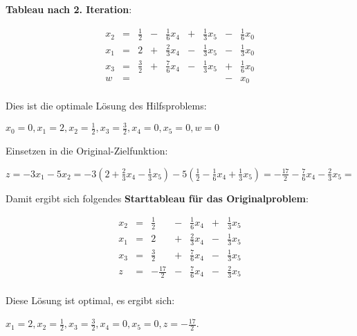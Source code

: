 \documentclass[a4paper,11pt]{article}
\begin{document}
\begin{enumerate}
        \textbf{Tableau nach 2. Iteration}:

        \[\begin{array}{rcrcrcrcr}
            x_2 & = & \frac{1}{2} & - & \frac{1}{6}x_4 & + & \frac{1}{3}x_5 & - & \frac{1}{6}x_0 \\[3pt]
            x_1 & = &           2 & + & \frac{2}{3}x_4 & - & \frac{1}{3}x_5 & - & \frac{1}{3}x_0 \\[3pt]
            x_3 & = & \frac{3}{2} & + & \frac{7}{6}x_4 & - & \frac{1}{3}x_5 & + & \frac{1}{6}x_0 \\[3pt] \hline
              w & = & & & & & & - & x_0 \\[3pt]
        \end{array}\]

        Dies ist die optimale Lösung des Hilfsproblems:

        \( x_0 = 0, x_1 = 2, x_2 = \frac{1}{2}, x_3 = \frac{3}{2}, x_4 = 0, x_5 = 0, w = 0 \)

        Einsetzen in die Original-Zielfunktion:

        \( z = -3 x_1 - 5x_2 = -3\left( 2 + \frac{2}{3}x_4 - \frac{1}{3}x_5 \right) - 5 \left( \frac{1}{2} - \frac{1}{6}x_4 + \frac{1}{3}x_5 \right)
             = - \frac{17}{2} - \frac{7}{6}x_4 - \frac{2}{3} x_5 =  \)

        Damit ergibt sich folgendes \textbf{Starttableau für das Originalproblem}:

        \[\begin{array}{rcrcrcrcr}
            x_2 & = & \frac{1}{2} & - & \frac{1}{6}x_4 & + & \frac{1}{3}x_5 \\[3pt]
            x_1 & = &           2 & + & \frac{2}{3}x_4 & - & \frac{1}{3}x_5 \\[3pt]
            x_3 & = & \frac{3}{2} & + & \frac{7}{6}x_4 & - & \frac{1}{3}x_5 \\[3pt] \hline
              z & = &-\frac{17}{2}& - & \frac{7}{6}x_4 & - & \frac{2}{3}x_5 \\[3pt]
        \end{array}\]

        Diese Lösung ist optimal, es ergibt sich:

        \( x_1 = 2, x_2 = \frac{1}{2}, x_3 = \frac{3}{2}, x_4 = 0, x_5 = 0, z = -\frac{17}{2} \).

\end{enumerate}
\end{document}
